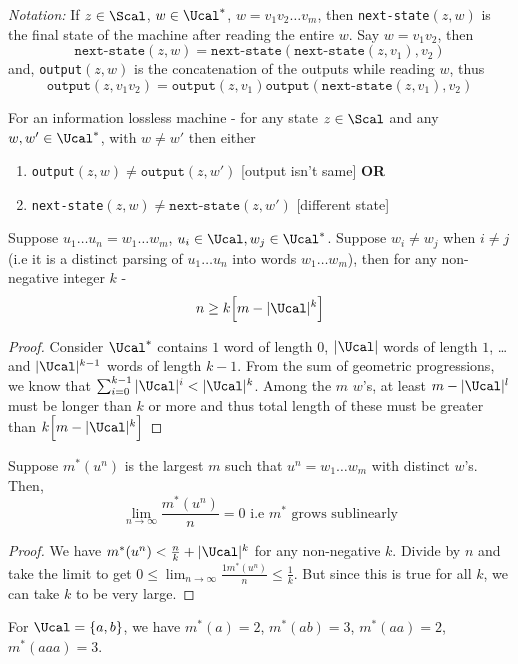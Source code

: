 \begin{remark}
\textit{Notation:} If $z \in \Scal$, $w \in \Ucal^*$, $w = v_1v_2\dots v_m$, then \texttt{next-state}$(z,w)$ is the final state of the machine after reading the entire $w$. Say $w = v_1v_2$, then
\[\texttt{next-state}(z,w) = \texttt{next-state}(\texttt{next-state}(z,v_1), v_2)\]
and, \texttt{output}$(z,w)$ is the concatenation of the outputs while reading $w$, thus
\[\texttt{output}(z,v_1v_2) = \texttt{output}(z,v_1) \texttt{output}(\texttt{next-state}(z,v_1), v_2) \]
\end{remark}
For an information lossless machine - for any state $z \in \Scal$ and any $w,w' \in \Ucal^*$, with $w \neq w'$ then either
\begin{enumerate}
    \item \texttt{output}$(z,w) \neq \texttt{output}(z,w')$ [output isn't same] \textbf{OR }
    \item \texttt{next-state}$(z,w) \neq \texttt{next-state}(z,w')$ [different state]
\end{enumerate}
\begin{lemma}
Suppose $u_1\dots u_n = w_1\dots w_m$, $u_i \in \Ucal, w_j \in \Ucal^*$. Suppose $w_i \neq w_j$ when $i \neq j$ (i.e it is a distinct parsing of $u_1\dots u_n$ into words $w_1 \dots w_m$), then for any non-negative integer $k$ - 
\[ n \geq k\Big[m - |\Ucal|^k\Big]\]
\end{lemma}
\begin{proof}
Consider $\Ucal^*$ contains $1$ word of length 0, $|\Ucal|$ words of length $1$, \dots and $|\Ucal|^{k-1}$ words of length $k-1$. From the sum of geometric progressions, we know that $\sum_{i=0}^{k-1} |\Ucal|^i < |\Ucal|^k$. Among the $m$ $w$'s, at least $m - |\Ucal|^l$ must be longer than $k$ or more and thus total length of these must be greater than $k\Big[m - |\Ucal|^k\Big]$
\end{proof}
\begin{corollary}
Suppose $m^*(u^n)$ is the largest $m$ such that $u^n = w_1\dots w_m$ with distinct $w$'s. Then,
\[ \lim_{n\to\infty} \frac{m^*(u^n)}{n} = 0 \text{ i.e }m^*\text{ grows sublinearly}\]
\end{corollary}
\begin{proof}
We have $m^*(u^n) < \frac{n}{k} + |\Ucal|^k$ for any non-negative $k$. Divide by $n$ and take the limit to get $0 \leq \lim_{n\to\infty} \frac{1m^*(u^n)}{n} \leq \frac{1}{k}$. But since this is true for all $k$, we can take $k$ to be very large.
\end{proof}
\begin{eg}
For $\Ucal = \{a,b\}$, we have $m^*(a) = 2$, $m^*(ab) = 3$, $m^*(aa) = 2$, $m^*(aaa) = 3$.
\end{eg}
